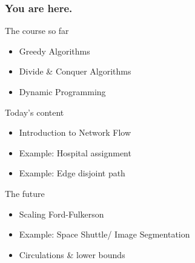 \begin{frame}
	\frametitle{You are here.}
	\begin{block}{The course so far}
		\begin{itemize}
			\item Greedy Algorithms
			\item Divide \& Conquer Algorithms
			\item Dynamic Programming
		\end{itemize}
	\end{block}
	\pause
	\begin{exampleblock}{Today's content}
		\begin{itemize}
			\item Introduction to Network Flow
			\item Example: Hospital assignment
			\item Example: Edge disjoint path
		\end{itemize}
	\end{exampleblock}
	\pause
	\begin{block}{The future}
		\begin{itemize}
			\item Scaling Ford-Fulkerson
			\item Example: Space Shuttle/ Image Segmentation
			\item Circulations \& lower bounds
		\end{itemize}
	\end{block}
\end{frame}
